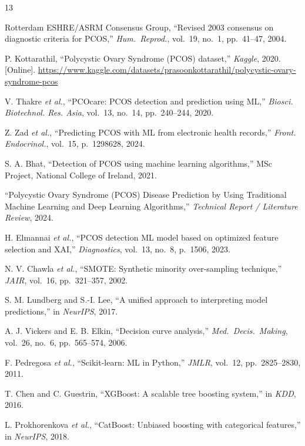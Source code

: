 \documentclass[10pt,twocolumn,a4paper]{article}
\begin{document}
\small
\begin{thebibliography}{13}

Rotterdam ESHRE/ASRM Consensus Group, ``Revised 2003 consensus on diagnostic criteria
for PCOS,'' \emph{Hum.\ Reprod.}, vol.~19, no.~1, pp.~41--47, 2004.

P. Kottarathil, ``Polycystic Ovary Syndrome (PCOS) dataset,'' \emph{Kaggle}, 2020.
[Online]. \url{https://www.kaggle.com/datasets/prasoonkottarathil/polycystic-ovary-syndrome-pcos}

V. Thakre \emph{et al.}, ``PCOcare: PCOS detection and prediction using ML,''
\emph{Biosci. Biotechnol. Res. Asia}, vol.~13, no.~14, pp.~240--244, 2020.

Z. Zad \emph{et al.}, ``Predicting PCOS with ML from electronic health records,''
\emph{Front. Endocrinol.}, vol.~15, p.~1298628, 2024.

S. A. Bhat, ``Detection of PCOS using machine learning algorithms,''
MSc Project, National College of Ireland, 2021.

``Polycystic Ovary Syndrome (PCOS) Disease Prediction by Using Traditional Machine Learning and Deep Learning Algorithms,'' \emph{Technical Report / Literature Review}, 2024.

H. Elmannai \emph{et al.}, ``PCOS detection ML model based on optimized feature
selection and XAI,'' \emph{Diagnostics}, vol.~13, no.~8, p.~1506, 2023.

N. V. Chawla \emph{et al.}, ``SMOTE: Synthetic minority over-sampling technique,''
\emph{JAIR}, vol.~16, pp.~321--357, 2002.

S. M. Lundberg and S.-I. Lee, ``A unified approach to interpreting model predictions,''
in \emph{NeurIPS}, 2017.

A. J. Vickers and E. B. Elkin, ``Decision curve analysis,''
\emph{Med.\ Decis.\ Making}, vol.~26, no.~6, pp.~565--574, 2006.

F. Pedregosa \emph{et al.}, ``Scikit-learn: ML in Python,''
\emph{JMLR}, vol.~12, pp.~2825--2830, 2011.

T. Chen and C. Guestrin, ``XGBoost: A scalable tree boosting system,''
in \emph{KDD}, 2016.

L. Prokhorenkova \emph{et al.}, ``CatBoost: Unbiased boosting with categorical features,''
in \emph{NeurIPS}, 2018.

\end{thebibliography}
\end{document}
